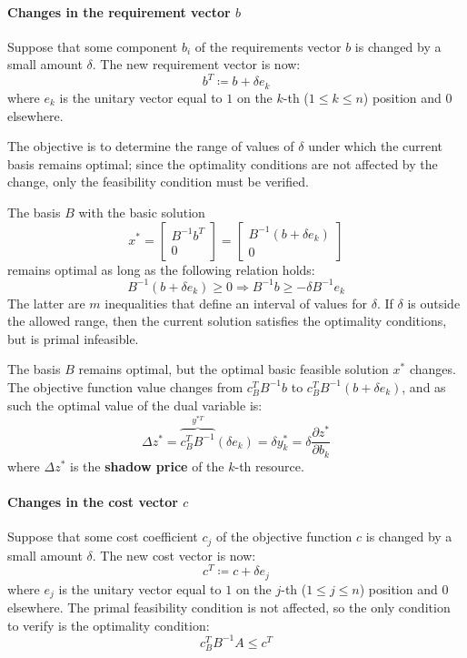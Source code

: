 \documentclass[english]{article}
\begin{document}
\paragraph[Changes in the requirement vector b]{Changes in the requirement vector \(b\)}

Suppose that some component \(b_i\) of the requirements vector \(b\) is changed by a small amount \(\delta\).
The new requirement vector is now:
\[ b^T \coloneqq b + \delta e_k \]
where \(e_k\) is the unitary vector equal to \(1\) on the \(k\)-th (\(1 \leq k \leq n\)) position and \(0\) elsewhere.

The objective is to determine the range of values of \(\delta\) under which the current basis remains optimal;
since the optimality conditions are not affected by the change, only the feasibility condition must be verified.

The basis \(B\) with the basic solution
\[ x^\ast = \begin{bmatrix} B^{-1} b^T \\ 0 \end{bmatrix} = \begin{bmatrix} B^{-1} \left( b + \delta e_k \right) \\ 0 \end{bmatrix} \]
remains optimal as long as the following relation holds:
\[ B^{-1} \left( b + \delta e_k \right) \geq 0 \Rightarrow B^{-1} b \geq - \delta B^{-1} e_k \]
The latter are \(m\) inequalities that define an interval of values for \(\delta \).
If \(\delta\) is outside the allowed range, then the current solution satisfies the optimality conditions, but is primal infeasible.

The basis \(B\) remains optimal, but the optimal basic feasible solution \(x^\ast\) changes.
The objective function value changes from \(c_B^T B^{-1} b\) to \(c_B^T B^{-1} \left( b + \delta e_k \right)\), and as such the optimal value of the dual variable is:
\[ \Delta z^\ast = \overbrace{c_B^T B^{-1}}^{y^{\ast T}} \left( \delta e_k \right) = \delta  y_k^\ast = \delta  \dfrac{\partial z^\ast}{\partial b_k}\]
where \(\Delta z^\ast\) is the \textbf{shadow price} of the \(k\)-th resource.

\paragraph[Changes in the cost vector c]{Changes in the cost vector \(c\)}

Suppose that some cost coefficient \(c_j\) of the objective function \(c\) is changed by a small amount \(\delta\).
The new cost vector is now:
\[ c^T \coloneqq c + \delta  e_j \]
where \(e_j\) is the unitary vector equal to \(1\) on the \(j\)-th (\(1 \leq j \leq n\)) position and \(0\) elsewhere.
The primal feasibility condition is not affected, so the only condition to verify is the optimality condition:
\[ c^T_B B^{-1} A \leq c^T \]
\end{document}
